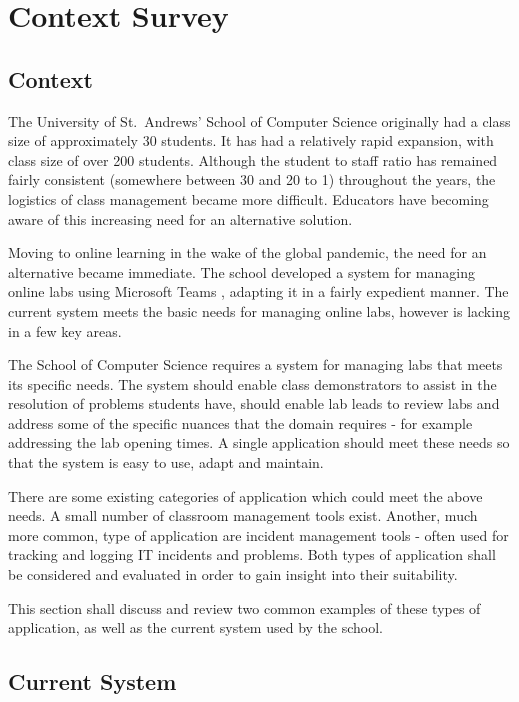 \chapter{Context Survey}
\section{Context}

The University of St.\ Andrews' School of Computer Science originally had a class size of approximately 30 students. It has had a relatively rapid expansion, with class size of over 200 students. Although the student to staff ratio has remained fairly consistent (somewhere between 30 and 20 to 1) throughout the years, the logistics of class management became more difficult. Educators have becoming aware of this increasing need for an alternative solution.

Moving to online learning in the wake of the global pandemic, the need for an alternative became immediate. The school developed a system for managing online labs using Microsoft Teams \cite{teams}, adapting it in a fairly expedient manner. The current system meets the basic needs for managing online labs, however is lacking in a few key areas.  

The School of Computer Science requires a system for managing labs that meets its specific needs. The system should enable class demonstrators to assist in the resolution of problems students have, should enable lab leads to review labs and address some of the specific nuances that the domain requires - for example addressing the lab opening times. A single application should meet these needs so that the system is easy to use, adapt and maintain.

There are some existing categories of application which could meet the above needs. A small number of classroom management tools exist. Another, much more common, type of application are incident management tools - often used for tracking and logging IT incidents and problems. Both types of application shall be considered and evaluated in order to gain insight into their suitability.
 
This section shall discuss and review two common examples of these types of application, as well as the current system used by the school.

\section{Current System}

